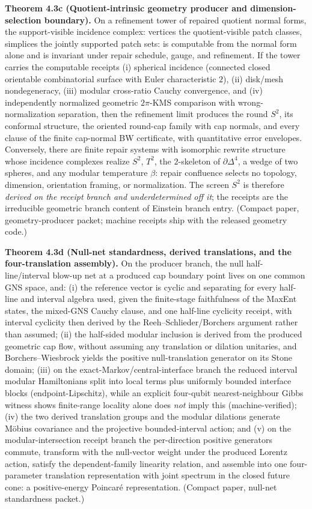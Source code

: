 \textbf{Theorem 4.3c (Quotient-intrinsic geometry producer and dimension-selection boundary).} On a refinement tower of repaired quotient normal forms, the support-visible incidence complex: vertices the quotient-visible patch classes, simplices the jointly supported patch sets: is computable from the normal form alone and is invariant under repair schedule, gauge, and refinement. If the tower carries the computable receipts (i) spherical incidence (connected closed orientable combinatorial surface with Euler characteristic \(2\)), (ii) disk/mesh nondegeneracy, (iii) modular cross-ratio Cauchy convergence, and (iv) independently normalized geometric \(2\pi\)-KMS comparison with wrong-normalization separation, then the refinement limit produces the round \(S^2\), its conformal structure, the oriented round-cap family with cap normals, and every clause of the finite cap-normal BW certificate, with quantitative error envelopes. Conversely, there are finite repair systems with isomorphic rewrite structure whose incidence complexes realize \(S^2\), \(T^2\), the \(2\)-skeleton of \(\partial\Delta^4\), a wedge of two spheres, and any modular temperature \(\beta\): repair confluence selects no topology, dimension, orientation framing, or normalization. The screen \(S^2\) is therefore \emph{derived on the receipt branch and underdetermined off it}; the receipts are the irreducible geometric branch content of Einstein branch entry. (Compact paper, geometry-producer packet; machine receipts ship with the released geometry code.)

\textbf{Theorem 4.3d (Null-net standardness, derived translations, and the four-translation assembly).} On the producer branch, the null half-line/interval blow-up net at a produced cap boundary point lives on one common GNS space, and: (i) the reference vector is cyclic and separating for every half-line and interval algebra used, given the finite-stage faithfulness of the MaxEnt states, the mixed-GNS Cauchy clause, and one half-line cyclicity receipt, with interval cyclicity then derived by the Reeh--Schlieder/Borchers argument rather than assumed; (ii) the half-sided modular inclusion is derived from the produced geometric cap flow, without assuming any translation or dilation unitaries, and Borchers--Wiesbrock yields the positive null-translation generator on its Stone domain; (iii) on the exact-Markov/central-interface branch the reduced interval modular Hamiltonians split into local terms plus uniformly bounded interface blocks (endpoint-Lipschitz), while an explicit four-qubit nearest-neighbour Gibbs witness shows finite-range locality alone does \emph{not} imply this (machine-verified); (iv) the two derived translation groups and the modular dilations generate M\"obius covariance and the projective bounded-interval action; and (v) on the modular-intersection receipt branch the per-direction positive generators commute, transform with the null-vector weight under the produced Lorentz action, satisfy the dependent-family linearity relation, and assemble into one four-parameter translation representation with joint spectrum in the closed future cone: a positive-energy Poincar\'e representation. (Compact paper, null-net standardness packet.)

